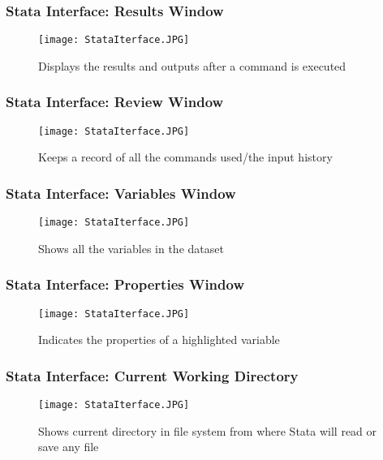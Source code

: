 \documentclass[11pt, xcolor=x11names,compress]{beamer}
\begin{document}
\begin{frame}[fragile,t]
\frametitle{Stata Interface: Results Window}
\begin{figure}
    \centering
    \texttt{[image: StataIterface.JPG]}
    \label{fig:my_label}
    \caption{Displays the results and outputs after a command is executed}
\end{figure}
\end{frame}

\begin{frame}[fragile,t]
\frametitle{Stata Interface: Review Window}
\begin{figure}
    \centering
    \texttt{[image: StataIterface.JPG]}
    \label{fig:my_label}
    \caption{Keeps a record of all the commands used/the input history}
\end{figure}
\end{frame}

\begin{frame}[fragile,t]
\frametitle{Stata Interface: Variables Window}
\begin{figure}
    \centering
    \texttt{[image: StataIterface.JPG]}
    \label{fig:my_label}
    \caption{Shows all the variables in the dataset}
\end{figure}
\end{frame}

\begin{frame}[fragile,t]
\frametitle{Stata Interface: Properties Window}
\begin{figure}
    \centering
    \texttt{[image: StataIterface.JPG]}
    \label{fig:my_label}
    \caption{Indicates the properties of a highlighted variable}
\end{figure}
\end{frame}

\begin{frame}[fragile,t]
\frametitle{Stata Interface: Current Working Directory}
\begin{figure}
    \centering
    \texttt{[image: StataIterface.JPG]}
    \label{fig:my_label}
    \caption{Shows current directory in file system from where Stata will read or save any file}
\end{figure}
\end{frame}
\end{document}

